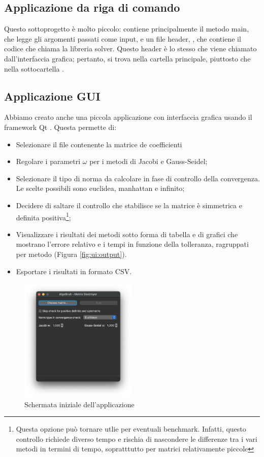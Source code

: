 \subsection{Applicazione da riga di comando}
Questo sottoprogetto è molto piccolo: contiene principalmente il metodo main, che legge gli argomenti passati come input, e un file header, , che contiene il codice che chiama la libreria solver. Questo header è lo stesso che viene chiamato dall'interfaccia grafica; pertanto, si trova nella cartella principale, piuttosto che nella sottocartella .


\subsection{Applicazione GUI}
Abbiamo creato anche una piccola applicazione con interfaccia grafica usando il framework Qt \cite{Qt}. Questa permette di:
\begin{itemize}
	\item Selezionare il file contenente la matrice de coefficienti
	\item Regolare i parametri $\omega$ per i metodi di Jacobi e Gauss-Seidel;
	\item Selezionare il tipo di norma da calcolare in fase di controllo della convergenza. Le scelte possibili sono euclidea, manhattan e infinito;
	\item Decidere di saltare il controllo che stabilisce se la matrice è simmetrica e definita positiva\footnote{Questa opzione può tornare utlie per eventuali benchmark. Infatti, questo controllo richiede diverso tempo e rischia di nascondere le differenze tra i vari metodi in termini di tempo, sopratttutto per matrici relativamente piccole};
	\item Visualizzare i risultati dei metodi sotto forma di tabella e di grafici che mostrano l'errore relativo e i tempi in funzione della tolleranza, ragruppati per metodo (Figura \ref{fig:ui:output}).
	\item Esportare i risultati in formato CSV.
\end{itemize}

\begin{figure}%
	\centering
	\includegraphics[width=0.5\textwidth]{figures/UI/main.png}
	\caption{Schermata iniziale dell'applicazione}%
	\label{fig:ui:main}%
\end{figure}

